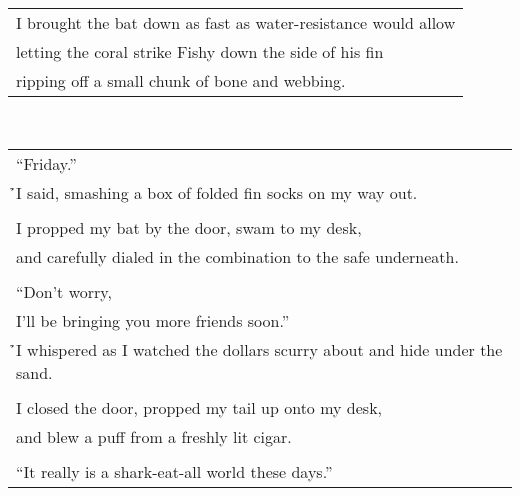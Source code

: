 \documentclass{article}
\begin{document}
\begin{center}
\begin{tabular}{l}
I brought the bat down as fast as water-resistance would allow \\
letting the coral strike Fishy down the side of his fin \\
ripping off a small chunk of bone and webbing. \\
\end{tabular} \\
\begin{tabular}{l}
``Friday.'' \\
\h\h{}I said, smashing a box of folded fin socks on my way out. \\
\\
I propped my bat by the door, swam to my desk, \\
and carefully dialed in the combination to the safe underneath. \\
\\
``Don't worry, \\
I'll be bringing you more friends soon.'' \\
\h\h{}I whispered as I watched the dollars scurry about and hide under the sand. \\
\\
I closed the door, propped my tail up onto my desk, \\
and blew a puff from a freshly lit cigar. \\
\\
``It really is a shark-eat-all world these days.'' \\
\end{tabular}
\end{center}
\end{document}
